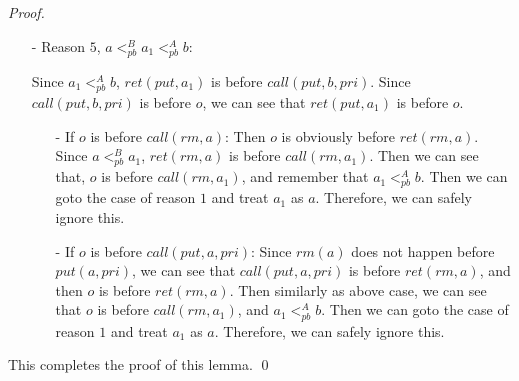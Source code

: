 \begin {proof}
\begin{itemize}
    According to above discussion, there are three possible enumeration of operations of $a$, $a_1$ and $b$, as shown in \figurename~\ref{fig:history enumeration 3 for PQ1Equal}, \figurename~\ref{fig:history enumeration 4 for PQ1Equal} and \figurename~\ref{fig:history enumeration 5 for PQ1Equal}. Here we explicitly draw the leftmost gap-point of $a$ as $o'$. Since the position of $\textit{ret}(\textit{put},a_1,\textit{pri})$ and $\textit{call}(\textit{put},a,\textit{pri})$ do not influence the correctness, we can simply ignore it. We also ignore $\textit{call}(\textit{put},b,\textit{pri})$ and $\textit{ret}(\textit{put},b)$, since the only requirements of them are (1) $\textit{rm}(b)$ does not happen before $\textit{put}(b)$ and (2) $\textit{call}(\textit{put},b,\textit{pri})$ is before $o$.

\item[-] Reason $5$, $a <_{\textit{pb}}^B a_1 <_{\textit{pb}}^A b$:

    Since $a_1 <_{\textit{pb}}^A b$, $\textit{ret}(\textit{put},a_1)$ is before $\textit{call}(\textit{put},b,\textit{pri})$. Since $\textit{call}(\textit{put},b,\textit{pri})$ is before $o$, we can see that $\textit{ret}(\textit{put},a_1)$ is before $o$.

    \begin{itemize}
    \setlength{\itemsep}{0.5pt}
    \item[-] If $o$ is before $\textit{call}(\textit{rm},a)$: Then $o$ is obviously before $\textit{ret}(\textit{rm},a)$. Since $a <_{\textit{pb}}^B a_1$, $\textit{ret}(\textit{rm},a)$ is before $\textit{call}(\textit{rm},a_1)$. Then we can see that, $o$ is before $\textit{call}(\textit{rm},a_1)$, and remember that $a_1 <_{\textit{pb}}^A b$. Then we can goto the case of reason $1$ and treat $a_1$ as $a$. Therefore, we can safely ignore this.

    \item[-] If $o$ is before $\textit{call}(\textit{put},a,\textit{pri})$: Since $\textit{rm}(a)$ does not happen before $\textit{put}(a,\textit{pri})$, we can see that $\textit{call}(\textit{put},a,\textit{pri})$ is before $\textit{ret}(\textit{rm},a)$, and then $o$ is before $\textit{ret}(\textit{rm},a)$. Then similarly as above case, we can see that $o$ is before $\textit{call}(\textit{rm},a_1)$, and $a_1 <_{\textit{pb}}^A b$. Then we can goto the case of reason $1$ and treat $a_1$ as $a$. Therefore, we can safely ignore this.
    \end{itemize}
\end{itemize}

This completes the proof of this lemma. \qed
\end {proof}

